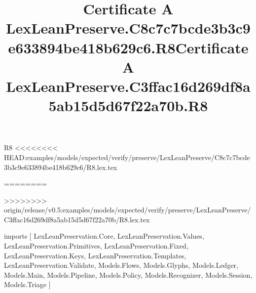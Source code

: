 \begin{lexlean}{R8}
<<<<<<<< HEAD:examples/models/expected/verify/preserve/LexLeanPreserve/C8c7c7bcde3b3c9e633894be418b629c6/R8.lex.tex
\title{Certificate A LexLeanPreserve.C8c7c7bcde3b3c9e633894be418b629c6.R8}
========
\title{Certificate A LexLeanPreserve.C3ffac16d269df8a5ab15d5d67f22a70b.R8}
>>>>>>>> origin/release/v0.5:examples/models/expected/verify/preserve/LexLeanPreserve/C3ffac16d269df8a5ab15d5d67f22a70b/R8.lex.tex
\begin{coremodule}
imports [
  LexLeanPreservation.Core,
  LexLeanPreservation.Values,
  LexLeanPreservation.Primitives,
  LexLeanPreservation.Fixed,
  LexLeanPreservation.Keys,
  LexLeanPreservation.Templates,
  LexLeanPreservation.Validate,
  Models.Flows,
  Models.Glyphs,
  Models.Ledger,
  Models.Main,
  Models.Pipeline,
  Models.Policy,
  Models.Recognizer,
  Models.Session,
  Models.Triage
]


\end{coremodule}
\end{lexlean}
